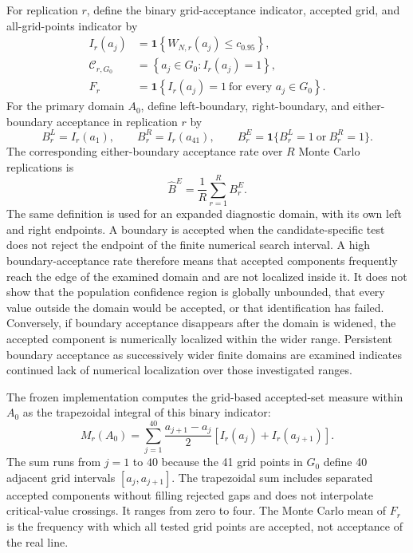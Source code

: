 For replication $r$, define the binary grid-acceptance indicator, accepted grid, and all-grid-points indicator by
\begin{equation}
  \begin{aligned}
    I_r(a_j)
      &=\mathbf{1}\!\left\{W_{N,r}(a_j)\leq c_{0.95}\right\}, \\
    \mathcal{C}_{r,G_0}
      &=\left\{a_j\in G_0:I_r(a_j)=1\right\}, \\
    F_r
      &=\mathbf{1}\!\left\{I_r(a_j)=1\ \text{for every }a_j\in G_0\right\}.
  \end{aligned}
  \label{eq:grid-acceptance}
\end{equation}
For the primary domain $A_0$, define left-boundary, right-boundary, and either-boundary acceptance in replication $r$ by
\begin{equation}
  B_r^{L}=I_r(a_1),\qquad
  B_r^{R}=I_r(a_{41}),\qquad
  B_r^{E}=\mathbf{1}\{B_r^{L}=1\ \text{or}\ B_r^{R}=1\}.
  \label{eq:boundary-acceptance}
\end{equation}
The corresponding either-boundary acceptance rate over $R$ Monte Carlo replications is
\begin{equation}
  \widehat B^{E}
  =\frac{1}{R}\sum_{r=1}^{R}B_r^{E}.
  \label{eq:boundary-acceptance-rate}
\end{equation}
The same definition is used for an expanded diagnostic domain, with its own left and right endpoints. A boundary is accepted when the candidate-specific test does not reject the endpoint of the finite numerical search interval. A high boundary-acceptance rate therefore means that accepted components frequently reach the edge of the examined domain and are not localized inside it. It does not show that the population confidence region is globally unbounded, that every value outside the domain would be accepted, or that identification has failed. Conversely, if boundary acceptance disappears after the domain is widened, the accepted component is numerically localized within the wider range. Persistent boundary acceptance as successively wider finite domains are examined indicates continued lack of numerical localization over those investigated ranges.

The frozen implementation computes the grid-based accepted-set measure within $A_0$ as the trapezoidal integral of this binary indicator:
\begin{equation}
  M_r(A_0)
  =\sum_{j=1}^{40}\frac{a_{j+1}-a_j}{2}
    \left[I_r(a_j)+I_r(a_{j+1})\right].
  \label{eq:accepted-measure}
\end{equation}
The sum runs from $j=1$ to $40$ because the 41 grid points in $G_0$ define 40 adjacent grid intervals $[a_j,a_{j+1}]$. The trapezoidal sum includes separated accepted components without filling rejected gaps and does not interpolate critical-value crossings. It ranges from zero to four. The Monte Carlo mean of $F_r$ is the frequency with which all tested grid points are accepted, not acceptance of the real line.

